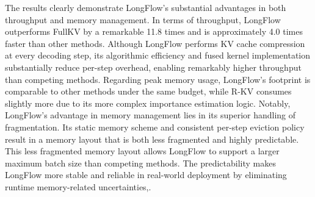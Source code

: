 The results clearly demonstrate LongFlow's substantial advantages in both throughput and memory management. In terms of throughput, LongFlow outperforms FullKV by a remarkable 11.8 times and is approximately 4.0 times faster than other methods.
Although LongFlow performs KV cache compression at every decoding step, its algorithmic efficiency and fused kernel implementation substantially reduce per-step overhead, enabling remarkably higher throughput than competing methods.
Regarding peak memory usage, LongFlow's footprint is comparable to other methods under the same budget, while R-KV consumes slightly more due to its more complex importance estimation logic.
Notably, LongFlow's advantage in memory management lies in its superior handling of fragmentation. Its static memory scheme and consistent per-step eviction policy result in a memory layout that is both less fragmented and highly predictable.
This less fragmented memory layout allows LongFlow to support a larger maximum batch size than competing methods.
The predictability makes LongFlow more stable and reliable in real-world deployment by eliminating runtime memory-related uncertainties,.


